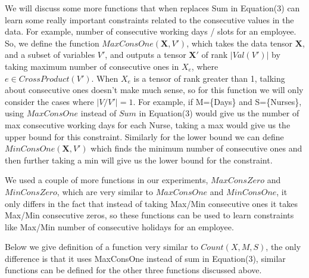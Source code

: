 \documentclass{article}
\begin{document}
We will discuss some more functions that when replaces Sum in Equation(3) can learn some really important constraints related to the consecutive values in the data. For example, number of consecutive working days / slots for an employee. So, we define the function $MaxConsOne(\textbf{X},V')$, which takes the data tensor $\textbf{X}$, and a subset of variables $V'$, and outputs a tensor $\textbf{X}'$ of rank $|Val(V')|$ by taking maximum number of consecutive ones in $X_e$, where $e \in CrossProduct(V')$. When $X_e$ is a tensor of rank greater than 1, talking about consecutive ones doesn't make much sense, so for this function we will only consider the cases where $|V/V'|=1$.
For example, if M=\{Days\} and S=\{Nurses\}, using $MaxConsOne$ instead of $Sum$ in Equation(3) would give us the number of max consecutive working days for each Nurse, taking a max would give us the upper bound for this constraint. Similarly for the lower bound we can define $MinConsOne(\textbf{X},V')$ which finds the minimum number of consecutive ones and then further taking a min will give us the lower bound for the constraint. 

We used a couple of more functions in our experiments, $MaxConsZero$ and $MinConsZero$, which are very similar to $MaxConsOne$ and $MinConsOne$, it only differs in the fact that instead of taking Max/Min consecutive ones it takes Max/Min consecutive zeros, so these functions can be used to learn constraints like Max/Min number of consecutive holidays for an employee.

Below we give definition of a function very similar to $Count(X,M,S)$, the only difference is that it uses MaxConsOne instead of sum in Equation(3), similar functions can be defined for the other three functions discussed above.
\end{document}
